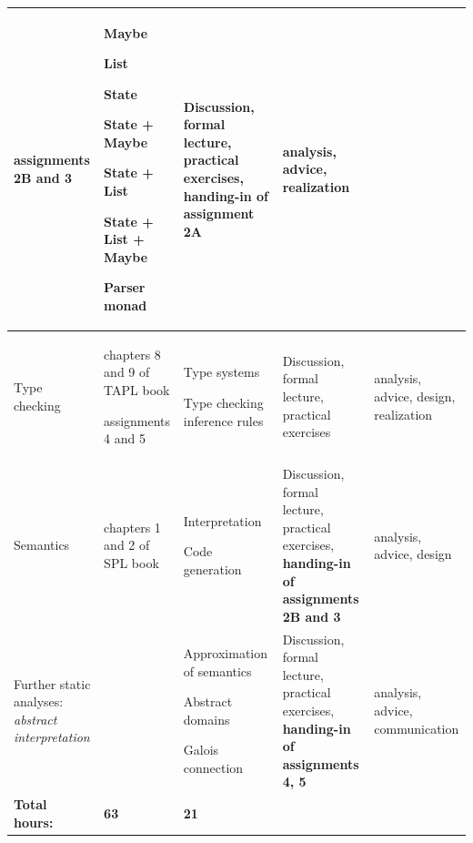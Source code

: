 \documentclass[a4paper, 10pt]{article}
\begin{document}
{\begin{tabular}{ | p{2.5cm} | p{2.5cm} | p{5cm} | p{2.5cm} | p{2.5cm} | }
\begin{inparaenum}
					\item assignments 2B and 3
				\end{inparaenum} & 		
				\begin{inparaenum}
					\item Maybe
					\item List
					\item State
					\item State + Maybe
					\item State + List
					\item State + List + Maybe
					\item Parser monad
				\end{inparaenum}
			& Discussion, formal lecture, practical exercises, \textbf{handing-in of assignment 2A} & analysis, advice, realization \\
		\hline
		Type checking & 
				\begin{inparaenum}
					\item chapters 8 and 9 of TAPL book
					\item assignments 4 and 5
				\end{inparaenum} & 		
				\begin{inparaenum}
					\item Type systems
					\item Type checking inference rules
				\end{inparaenum}
			& Discussion, formal lecture, practical exercises & analysis, advice, design, realization \\
		\hline
		Semantics & chapters 1 and 2 of SPL book & 
				\begin{inparaenum}
					\item Interpretation
					\item Code generation
				\end{inparaenum}
			& Discussion, formal lecture, practical exercises, \textbf{handing-in of assignments 2B and 3} & analysis, advice, design \\
		\hline
		Further static analyses: \textit{abstract interpretation} & &
				\begin{inparaenum}
					\item Approximation of semantics
					\item Abstract domains
					\item Galois connection
				\end{inparaenum}
			& Discussion, formal lecture, practical exercises, \textbf{handing-in of assignments 4, 5} & analysis, advice, communication \\
		\hline
		\textbf{Total hours:} & \textbf{63} & \textbf{21} & \\
		\hline
	\end{tabular}
	}
\end{document}
